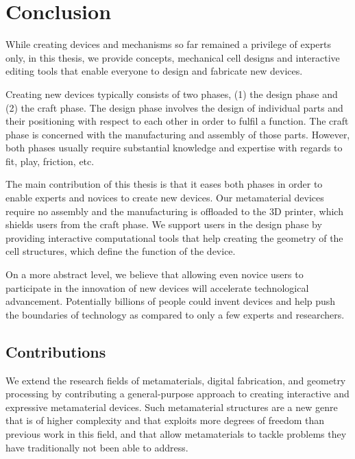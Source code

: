 \chapter{Conclusion}
\label{chapter:conclusion}

While creating devices and mechanisms so far remained a privilege of experts only, in this thesis, we provide concepts, mechanical cell designs and interactive editing tools that enable everyone to design and fabricate new devices. 

Creating new devices typically consists of two phases, (1) the design phase and (2) the craft phase. The design phase involves the design of individual parts and their positioning with respect to each other in order to fulfil a function. The craft phase is concerned with the manufacturing and assembly of those parts. However, both phases usually require substantial knowledge and expertise with regards to fit, play, friction, etc. 

The main contribution of this thesis is that it eases both phases in order to enable experts and novices to create new devices. Our metamaterial devices require no assembly and the manufacturing is offloaded to the 3D printer, which shields users from the craft phase. We support users in the design phase by providing interactive computational tools that help creating the geometry of the cell structures, which define the function of the device.

On a more abstract level, we believe that allowing even novice users to participate in the innovation of new devices will accelerate technological advancement. Potentially billions of people could invent devices and help push the boundaries of technology as compared to only a few experts and researchers. 


\section{Contributions}

We extend the research fields of metamaterials, digital fabrication, and geometry processing by contributing a general-purpose approach to creating interactive and expressive metamaterial devices. Such metamaterial structures are a new genre that is of higher complexity and that exploits more degrees of freedom than previous work in this field, and that allow metamaterials to tackle problems they have traditionally not been able to address. 


